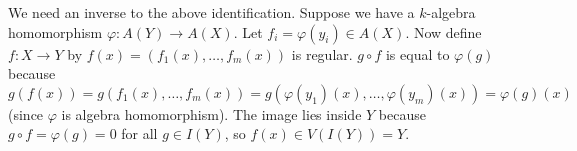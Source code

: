 We need an inverse to the above identification. Suppose we have a $k$-algebra homomorphism $\varphi:A(Y)\to A(X)$. Let $f_i=\varphi(y_i)\in A(X)$. Now define $f:X\to Y$ by $f(x)=(f_1(x),\ldots,f_m(x))$ is regular. $g\circ f$ is equal to $\varphi(g)$ because
\[
g(f(x))=g(f_1(x),\ldots,f_m(x))=g(\varphi(y_1)(x),\ldots,\varphi(y_m)(x))=\varphi(g)(x)
\]
(since $\varphi$ is algebra homomorphism). The image lies inside $Y$ because $g\circ f=\varphi(g)=0$ for all $g\in I(Y)$, so $f(x)\in V(I(Y))=Y$.
